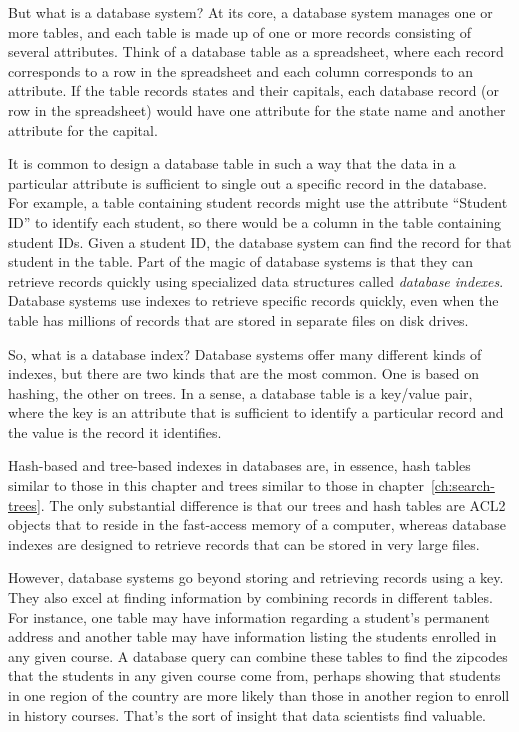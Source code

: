 But what is a database system? At its core, a database system
manages one or more tables, and each table is made up of one or more
records consisting of several attributes.
Think of a database table as a
spreadsheet, where each record corresponds to a row in the spreadsheet
and each column corresponds to an attribute. If the table
records states and their capitals, each database
record (or row in the spreadsheet) would have one attribute for the
state name and another attribute for the capital.

It is common to design a database table in such a way that the
data in a particular attribute is sufficient
to single out a specific record in the database.
For example, a table containing student records might use the attribute
``Student ID'' to identify each student, so there would be
a column in the table containing student IDs.
Given a student ID, the
database system can find the record for that student in the
table. Part of the magic of database systems is that they can retrieve
records quickly using specialized data
structures called \emph{database indexes}.
Database systems use indexes to retrieve specific records quickly,
even when the table has millions of records that are stored
in separate files on disk drives.

So, what is a database index? Database systems
offer many different kinds of indexes, but there are two kinds that are
the most common. One is based on hashing, the other on trees.
In a sense, a database
table is a key/value pair, where the key is an attribute that is
sufficient to identify a particular record and the value is the record
it identifies.

Hash-based and tree-based indexes
in databases are,
in essence, hash tables similar to those in this chapter
and trees similar to those in chapter~\ref{ch:search-trees}.
The only substantial difference
is that our trees and hash tables are ACL2 objects that
to reside in the fast-access memory of a computer,
whereas database indexes are designed to retrieve records
that can be stored in very large files.

However, database systems go beyond storing and retrieving records
using a key. They also excel at finding information by combining
records in different tables. For instance, one table may have
information regarding a student's permanent address and another table
may have information listing the students enrolled in any given course.
A database query can combine these tables to find the zipcodes that
the students in any given course come from, perhaps showing that students in one
region of the country are more likely than those in another region to
enroll in history courses. That's the sort of insight that
data scientists find valuable.

